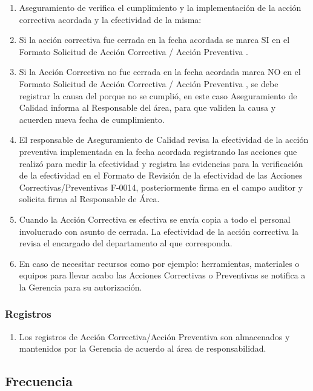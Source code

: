 \begin{enumerate}
	\item Aseguramiento de verifica el cumplimiento y la implementación de la acción correctiva acordada y la efectividad de la misma:
	\item Si la acción correctiva fue cerrada en la fecha acordada se marca SI en el Formato Solicitud de Acción Correctiva / Acción Preventiva \IdFormAACC.
	\item Si la Acción Correctiva no fue cerrada en la fecha acordada marca NO en el Formato Solicitud de Acción Correctiva / Acción Preventiva \IdFormAACC, se debe registrar la causa del porque no se cumplió, en este caso Aseguramiento de Calidad informa al Responsable del área, para que validen la causa y acuerden nueva fecha de cumplimiento.
	\item El responsable de Aseguramiento de Calidad revisa la efectividad de la acción preventiva implementada en la fecha acordada registrando las acciones que realizó para medir la efectividad y registra las evidencias para la verificación de la efectividad en el Formato de Revisión de la efectividad de las Acciones Correctivas/Preventivas F-0014, posteriormente firma en el campo auditor y solicita firma al Responsable de Área.
	\item Cuando la Acción Correctiva es efectiva se envía copia a todo el personal involucrado con asunto de cerrada. La efectividad de la acción correctiva la revisa el encargado del departamento al que corresponda.
	\item En caso de necesitar recursos como por ejemplo: herramientas, materiales o equipos para llevar acabo las Acciones Correctivas o Preventivas se notifica a la Gerencia para su autorización.
\end{enumerate}

\subsubsection{Registros}

\begin{enumerate}
	\item Los registros de Acción Correctiva/Acción Preventiva son almacenados y mantenidos por la Gerencia de acuerdo al área de responsabilidad.
\end{enumerate}

\subsection{Frecuencia}


